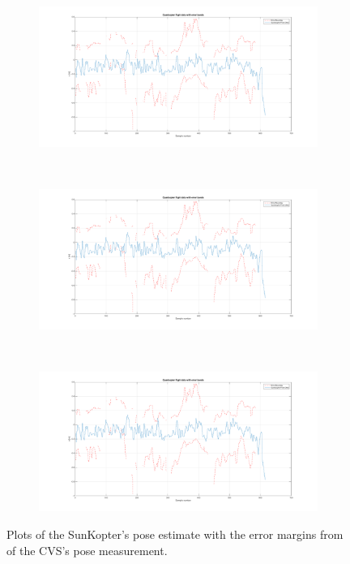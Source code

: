 \begin{figure}
  \begin{subfigure}{0.3\textwidth}
    \includegraphics[width=\textwidth]{figures/chapter5/x}
    \caption{}
  \end{subfigure}
  ~
  \begin{subfigure}{0.3\textwidth}
    \includegraphics[width=\textwidth]{figures/chapter5/x}
    \caption{}
  \end{subfigure}
  ~
  \begin{subfigure}{0.3\textwidth}
    \includegraphics[width=\textwidth]{figures/chapter5/x}
    \caption{}
  \end{subfigure}
  \caption[Plots of the SunKopter's flight and measurement errors.]{Plots of the SunKopter's pose estimate with the error margins from of the CVS's pose measurement. }
  \label{fig:chap5-results}
\end{figure}

